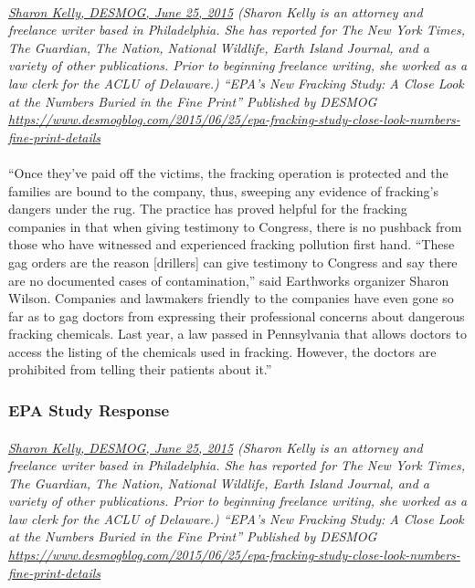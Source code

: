 \documentclass{article}
\begin{document}
\paragraph{}
\small
\textit{
\underline{Sharon Kelly, DESMOG,  June 25, 2015}
(Sharon Kelly is an attorney and freelance writer based in Philadelphia. She has reported for The New York Times, The Guardian, The Nation, National Wildlife, Earth Island Journal, and a variety of other publications. Prior to beginning freelance writing, she worked as a law clerk for the ACLU of Delaware.) “EPA's New Fracking Study: A Close Look at the Numbers Buried in the Fine Print” Published by DESMOG  
\url{https://www.desmogblog.com/2015/06/25/epa-fracking-study-close-look-numbers-fine-print-details}}
\normalsize

\paragraph{}
``Once they’ve paid off the victims, the fracking operation is protected and the families are bound to the company, thus, sweeping any evidence of fracking’s dangers under the rug. The practice has proved helpful for the fracking companies in that when giving testimony to Congress, there is no pushback from those who have witnessed and experienced fracking pollution first hand.     “These gag orders are the reason [drillers] can give testimony to Congress and say there are no documented cases of contamination,” said Earthworks organizer Sharon Wilson.  Companies and lawmakers friendly to the companies have even gone so far as to gag doctors from expressing their professional concerns about dangerous fracking chemicals. Last year, a law passed in Pennsylvania that allows doctors to access the listing of the chemicals used in fracking. However, the doctors are prohibited from telling their patients about it.”

\subsubsection{EPA Study Response}
\paragraph{}
\small
\textit{
\underline{Sharon Kelly, DESMOG,  June 25, 2015}
(Sharon Kelly is an attorney and freelance writer based in Philadelphia. She has reported for The New York Times, The Guardian, The Nation, National Wildlife, Earth Island Journal, and a variety of other publications. Prior to beginning freelance writing, she worked as a law clerk for the ACLU of Delaware.) “EPA's New Fracking Study: A Close Look at the Numbers Buried in the Fine Print” Published by DESMOG  
\url{https://www.desmogblog.com/2015/06/25/epa-fracking-study-close-look-numbers-fine-print-details}}
\normalsize
\end{document}
